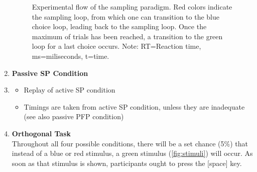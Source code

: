 \documentclass[
	12pt,
	oneside,
	bibliography=totocnumbered]{scrartcl}
\begin{document}
\begin{enumerate}
\begin{figure}[h!]
\begin{center}
{\begin{tikzpicture}
\end{tikzpicture}
} %

\captionsetup{width=.9\linewidth, format=plain}
\caption[Flow Sampling Paradigm]{Experimental flow of the sampling paradigm. Red colors indicate the sampling loop, from which one can transition to the blue choice loop, leading back to the sampling loop. Once the maximum of trials has been reached, a transition to the green loop for a last choice occurs. Note: RT=Reaction time, ms=miliseconds, t=time. }
\label{fig:spFlow}
\end{center}
\end{figure}





\item \textbf{Passive SP Condition} \\\item
\begin{itemize}
\item Replay of active SP condition
\item Timings are taken from active SP condition, unless they are inadequate (see also passive PFP condition)
\end{itemize}


\item \textbf{Orthogonal Task} \\
Throughout all four possible conditions, there will be a set chance (5\%) that instead of a blue or red stimulus, a green stimulus (\ref{fig:stimuli}) will occur. As soon as that stimulus is shown, participants ought to press the [space] key.
\end{enumerate} 
\end{document}
